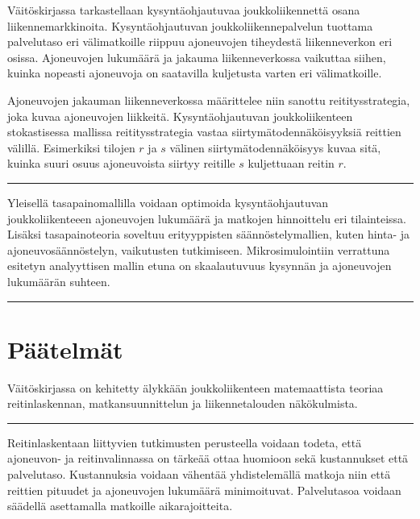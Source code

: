 \documentclass[a4paper,12pt]{article}
\newcommand*\sepline{%
  \begin{center}
    \rule[1ex]{.5\textwidth}{.5pt}
  \end{center}}
\begin{document}
Väitöskirjassa tarkastellaan kysyntäohjautuvaa joukkoliikennettä osana liikennemarkkinoita. Kysyntäohjautuvan joukkoliikennepalvelun
tuottama palvelutaso eri välimatkoille riippuu ajoneuvojen tiheydestä liikenneverkon eri osissa.
Ajoneuvojen lukumäärä ja jakauma liikenneverkossa vaikuttaa siihen, kuinka nopeasti ajoneuvoja on 
saatavilla kuljetusta varten eri välimatkoille.

Ajoneuvojen jakauman liikenneverkossa määrittelee niin sanottu reititysstrategia, joka kuvaa ajoneuvojen liikkeitä.
Kysyntäohjautuvan joukkoliikenteen stokastisessa mallissa reititysstrategia vastaa siirtymätodennäköisyyksiä reittien välillä.
Esimerkiksi tilojen $r$ ja $s$ välinen siirtymätodennäköisyys kuvaa sitä, kuinka suuri osuus 
ajoneuvoista siirtyy reitille $s$ kuljettuaan reitin $r$.

\sepline
Yleisellä tasapainomallilla voidaan optimoida kysyntäohjautuvan joukkoliikenteeen ajoneuvojen lukumäärä ja 
matkojen hinnoittelu eri tilainteissa. Lisäksi tasapainoteoria soveltuu erityyppisten säännöstelymallien, 
kuten hinta- ja ajoneuvosäännöstelyn, vaikutusten tutkimiseen. Mikrosimulointiin verrattuna esitetyn analyyttisen mallin
etuna on skaalautuvuus kysynnän ja ajoneuvojen lukumäärän suhteen.

\sepline



\section*{Päätelmät}
Väitöskirjassa on kehitetty älykkään joukkoliikenteen matemaattista teoriaa reitinlaskennan, matkansuunnittelun ja
liikennetalouden näkökulmista.

\sepline

Reitinlaskentaan liittyvien tutkimusten perusteella voidaan todeta, että ajoneuvon- ja reitinvalinnassa on tärkeää 
ottaa huomioon sekä kustannukset että palvelutaso. Kustannuksia voidaan vähentää yhdistelemällä matkoja
niin että reittien pituudet ja ajoneuvojen lukumäärä minimoituvat. Palvelutasoa voidaan säädellä asettamalla 
matkoille aikarajoitteita.
\end{document}
